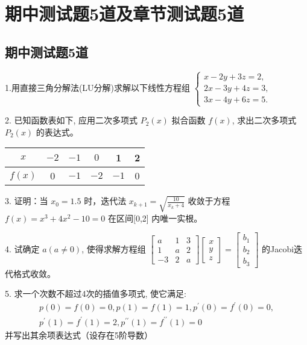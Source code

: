 \newpage
\section{期中测试题5道及章节测试题5道}

\subsection{期中测试题5道}

1.用直接三角分解法(LU分解)求解以下线性方程组 $ \left\{\begin{array}{l}x-2 y+3 z=2, \\ 2 x-3 y+4 z=3, \\ 3 x-4 y+6 z=5 .\end{array}\right. $

2. 已知函数表如下, 应用二次多项式 $ P_{2}(x) $ 拟合函数 $ f(x) $, 求出二次多项式 $ P_{2}(x) $ 的表达式。
\begin{center}
\begin{tabular}{|c|c|c|c|c|c|}
\hline$ x $ & $ -{2} $ & $ -{1} $ & $ {0} $ & 1 & 2 \\
\hline $ {f}({x}) $ & 0 & $-1$ & $-2$ & $-1$ & 0 \\
\hline
\end{tabular}
\end{center}

3. 证明：当 $ x_{0}=1.5 $ 时，迭代法 $ x_{k+1}=\sqrt{\frac{10}{x_{k}+4}} $ 收敛于方程 $ f(x)=x^{3}+4 x^{2}-10=0 $ 在区间[0,2] 内唯一实根。

4. 试确定 $ a(a \neq 0) $, 使得求解方程组 $ \left[\begin{array}{ccc}a & 1 & 3 \\ 1 & a & 2 \\ -3 & 2 & a\end{array}\right]\left[\begin{array}{l}x \\ y \\ z\end{array}\right]=\left[\begin{array}{l}b_{1} \\ b_{2} \\ b_{3}\end{array}\right] $ 的Jacobi迭代格式收敛。

5. 求一个次数不超过4次的插值多项式, 使它满足:
$$
\begin{array}{l}
p(0)=f(0)=0, p(1)=f(1)=1, p^{\prime}(0)=f^{\prime}(0)=0, \\
p^{\prime}(1)=f^{\prime}(1)=2, p^{\prime \prime}(1)=f^{\prime \prime}(1)=0
\end{array}
$$
并写出其余项表达式（设存在5阶导数）




